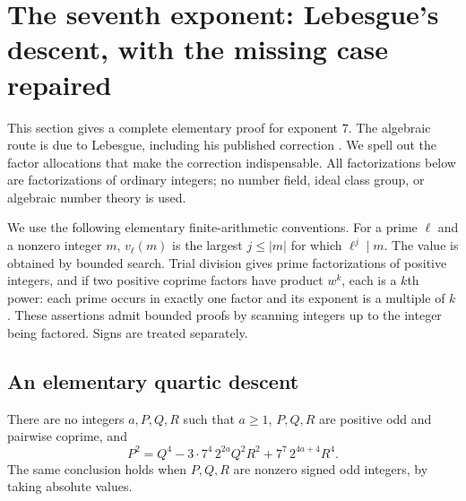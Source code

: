\section{The seventh exponent: Lebesgue's descent, with the missing case repaired}
\label{sec:seven}

This section gives a complete elementary proof for exponent $7$.  The algebraic
route is due to Lebesgue, including his published correction
\cite{Lebesgue1840,Lebesgue1840Add}.  We spell out the factor allocations that
make the correction indispensable.  All factorizations below are factorizations
of ordinary integers; no number field, ideal class group, or algebraic number
theory is used.

We use the following elementary finite-arithmetic conventions.  For a prime
$\ell$ and a nonzero integer $m$, $v_\ell(m)$ is the largest $j\leq |m|$ for
which $\ell^j\mid m$.  The value is obtained by bounded search.  Trial division
gives prime factorizations of positive integers, and if two positive coprime
factors have product $w^k$, each is a $k$th power: each prime occurs in exactly
one factor and its exponent is a multiple of $k$.  These assertions admit
bounded proofs by scanning integers up to the integer being factored.  Signs
are treated separately.

\subsection{An elementary quartic descent}

\begin{lemma}
\label{lem:seven-quartic}
There are no integers $a,P,Q,R$ such that $a\geq1$, $P,Q,R$ are positive odd
and pairwise coprime, and
\begin{equation}\label{eq:seven-quartic}
 P^2=Q^4-3\cdot7^4\,2^{2a}Q^2R^2
              +7^7\,2^{4a+4}R^4.
\end{equation}
The same conclusion holds when $P,Q,R$ are nonzero signed odd integers, by
taking absolute values.
\end{lemma}

